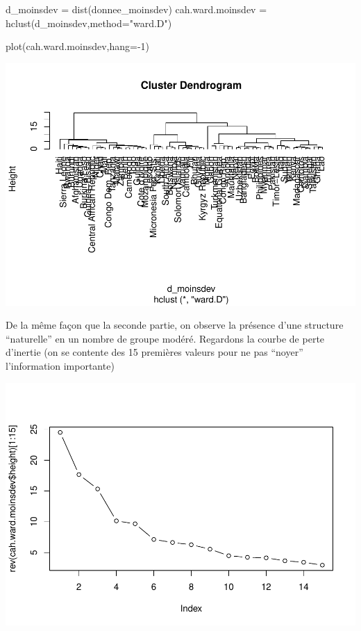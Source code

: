 \documentclass[
]{article}
\newenvironment{Shaded}{}{}
\newcommand{\AttributeTok}[1]{#1}
\newcommand{\DecValTok}[1]{#1}
\newcommand{\FunctionTok}[1]{#1}
\newcommand{\NormalTok}[1]{#1}
\newcommand{\OtherTok}[1]{\textcolor[rgb]{1.00,0.25,0.00}{#1}}
\newcommand{\SpecialCharTok}[1]{\textcolor[rgb]{0.00,0.50,0.50}{#1}}
\newcommand{\StringTok}[1]{\textcolor[rgb]{0.00,0.50,0.50}{#1}}
\begin{document}
\begin{Shaded}
\begin{Highlighting}[]
\NormalTok{d\_moinsdev }\OtherTok{=} \FunctionTok{dist}\NormalTok{(donnee\_moinsdev)}
\NormalTok{cah.ward.moinsdev }\OtherTok{=} \FunctionTok{hclust}\NormalTok{(d\_moinsdev,}\AttributeTok{method=}\StringTok{"ward.D"}\NormalTok{)}

\FunctionTok{plot}\NormalTok{(cah.ward.moinsdev,}\AttributeTok{hang=}\SpecialCharTok{{-}}\DecValTok{1}\NormalTok{)}
\end{Highlighting}
\end{Shaded}

\includegraphics{Projet_files/figure-latex/unnamed-chunk-33-1.pdf}

De la même façon que la seconde partie, on observe la présence d'une
structure ``naturelle'' en un nombre de groupe modéré. Regardons la
courbe de perte d'inertie (on se contente des 15 premières valeurs pour
ne pas ``noyer'' l'information importante)

\begin{Shaded}
\end{Shaded}

\includegraphics{Projet_files/figure-latex/unnamed-chunk-34-1.pdf}
\end{document}
